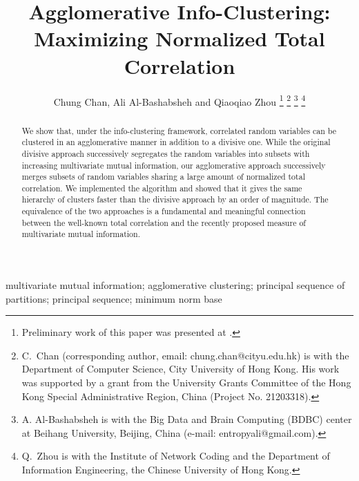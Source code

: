 \documentclass[letterpaper,onecolumn,draftcls]{IEEEtran}
\title{Agglomerative Info-Clustering:\\ Maximizing Normalized Total Correlation}
\author{Chung Chan, Ali Al-Bashabsheh and Qiaoqiao Zhou
  \thanks{Preliminary work of this paper was presented at \cite{chan18aic}.}
	\thanks{C.\ Chan (corresponding author, email:
          chung.chan@cityu.edu.hk) is with the Department of Computer Science, City University of Hong Kong. His work was supported by a grant
          from the University Grants Committee of the Hong Kong Special Administrative Region,
          China (Project No. 21203318).}
        \thanks{A. Al-Bashabsheh is with the Big Data and Brain
          Computing (BDBC) center at Beihang University, Beijing, China (e-mail:
          entropyali@gmail.com).}
        \thanks{Q.\ Zhou is with the Institute of Network Coding and the Department of Information Engineering, the Chinese University of Hong Kong.
	}
	}
\begin{document}

%
\IEEEoverridecommandlockouts
\maketitle

\begin{abstract}
We show that, under the info-clustering framework, correlated random variables can be clustered in an agglomerative manner in addition to a divisive one. While the original divisive approach successively segregates the random variables into subsets with increasing multivariate mutual information, our agglomerative approach successively merges subsets of random variables sharing a large amount of normalized total correlation. We implemented the algorithm and showed that it gives the same hierarchy of clusters faster than the divisive approach by an order of magnitude. The equivalence of the two approaches is a fundamental and meaningful connection between the well-known total correlation and the recently proposed measure of multivariate mutual information. 
\end{abstract} 

\begin{IEEEkeywords}
multivariate mutual information; agglomerative clustering; principal sequence of partitions; principal sequence; minimum norm base
\end{IEEEkeywords}





\end{document}
